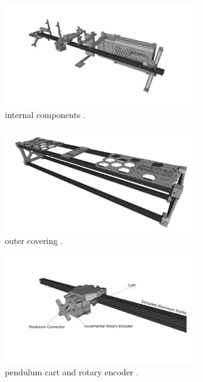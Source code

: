 \begin{figure}[H]
	\centering
	\includegraphics[width=0.75\textwidth]{"src/Images/Pendulum_inner.jpg"}
	\caption{internal components \cite{PendulumManual}.}
	\label{fig: Internal components}
\end{figure}

\begin{figure}[h!]
	\centering
	\includegraphics[width=0.75\textwidth]{"src/Images/Pendulum_outer.jpg"}
	\caption{outer covering \cite{PendulumManual}.}
	\label{fig: Outer covering}		
\end{figure}


\begin{figure}[H]
	\centering
	\includegraphics[width=0.75\textwidth]{"src/Images/Pendulum_cart.jpg"}
	\caption{pendulum cart and rotary encoder \cite{PendulumManual}.}
	\label{fig:Pendulum Cart}
\end{figure}  

